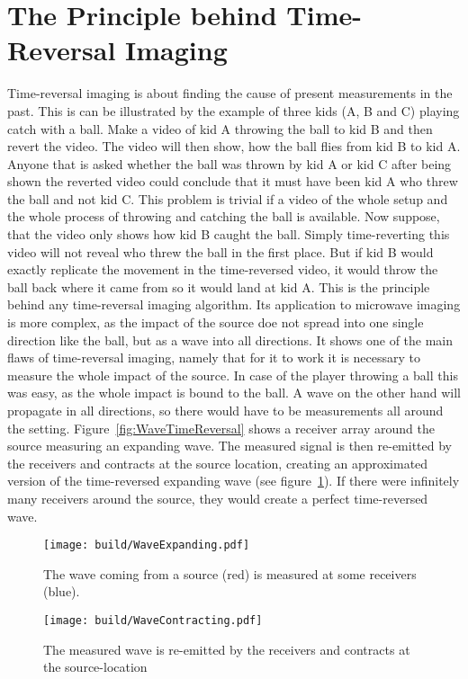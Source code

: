 \section{The Principle behind Time-Reversal Imaging}
Time-reversal imaging is about finding the cause of present measurements in the past.
This is can be illustrated by the example of three kids (A, B and C) playing catch with a ball.
Make a video of kid A throwing the ball to kid B and then revert the video.
The video will then show, how the ball flies from kid B to kid A.
Anyone that is asked whether the ball was thrown by kid A or kid C after being shown the reverted video could conclude that it must have been kid A who threw the ball and not kid C.
This problem is trivial if a video of the whole setup and the whole process of throwing and catching the ball is available.
Now suppose, that the video only shows how kid B caught the ball.
Simply time-reverting this video will not reveal who threw the ball in the first place.
But if kid B would exactly replicate the movement in the time-reversed video, it would throw the ball back where it came from so it would land at kid A.
This is the principle behind any time-reversal imaging algorithm.
Its application to microwave imaging is more complex, as the impact of the source doe not spread into one single direction like the ball, but as a wave into all directions.
It shows one of the main flaws of time-reversal imaging, namely that for it to work it is necessary to measure the whole impact of the source.
In case of the player throwing a ball this was easy, as the whole impact is bound to the ball.
A wave on the other hand will propagate in all directions, so there would have to be measurements all around the setting.
Figure~\ref{fig:WaveTimeReversal} shows a receiver array around the source measuring an expanding wave.
The measured signal is then re-emitted by the receivers and contracts at the source location, creating an approximated version of the time-reversed expanding wave (see figure~\ref{fig:WaveTimeReversalContraction}).
If there were infinitely many receivers around the source, they would create a perfect time-reversed wave.

\begin{figure}[ht]
    \centering
    \begin{minipage}{0.45\textwidth}
        \centering
        \texttt{[image: build/WaveExpanding.pdf]}
        \caption{The wave coming from a source (red) is measured at some receivers (blue).}\label{fig:WaveTimeReversal}
    \end{minipage}\hfill
    \begin{minipage}{0.45\textwidth}
        \centering
        \texttt{[image: build/WaveContracting.pdf]}
        \caption{The measured wave is re-emitted by the receivers and contracts at the source-location}\label{fig:WaveTimeReversalContraction}
    \end{minipage}
\end{figure}
